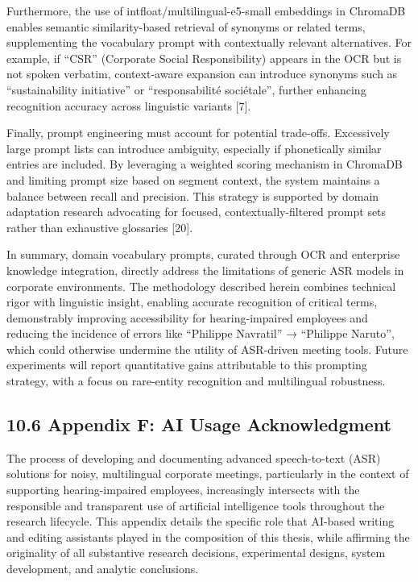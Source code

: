 \documentclass[12pt,a4paper]{article}
\begin{document}
Furthermore, the use of intfloat/multilingual-e5-small embeddings in ChromaDB enables semantic similarity-based retrieval of synonyms or related terms, supplementing the vocabulary prompt with contextually relevant alternatives. For example, if “CSR” (Corporate Social Responsibility) appears in the OCR but is not spoken verbatim, context-aware expansion can introduce synonyms such as “sustainability initiative” or “responsabilité sociétale”, further enhancing recognition accuracy across linguistic variants [7].


Finally, prompt engineering must account for potential trade-offs. Excessively large prompt lists can introduce ambiguity, especially if phonetically similar entries are included. By leveraging a weighted scoring mechanism in ChromaDB and limiting prompt size based on segment context, the system maintains a balance between recall and precision. This strategy is supported by domain adaptation research advocating for focused, contextually-filtered prompt sets rather than exhaustive glossaries [20].


In summary, domain vocabulary prompts, curated through OCR and enterprise knowledge integration, directly address the limitations of generic ASR models in corporate environments. The methodology described herein combines technical rigor with linguistic insight, enabling accurate recognition of critical terms, demonstrably improving accessibility for hearing-impaired employees and reducing the incidence of errors like “Philippe Navratil” → “Philippe Naruto”, which could otherwise undermine the utility of ASR-driven meeting tools. Future experiments will report quantitative gains attributable to this prompting strategy, with a focus on rare-entity recognition and multilingual robustness.


\subsection{10.6 Appendix F: AI Usage Acknowledgment}


The process of developing and documenting advanced speech-to-text (ASR) solutions for noisy, multilingual corporate meetings, particularly in the context of supporting hearing-impaired employees, increasingly intersects with the responsible and transparent use of artificial intelligence tools throughout the research lifecycle. This appendix details the specific role that AI-based writing and editing assistants played in the composition of this thesis, while affirming the originality of all substantive research decisions, experimental designs, system development, and analytic conclusions.
\end{document}

